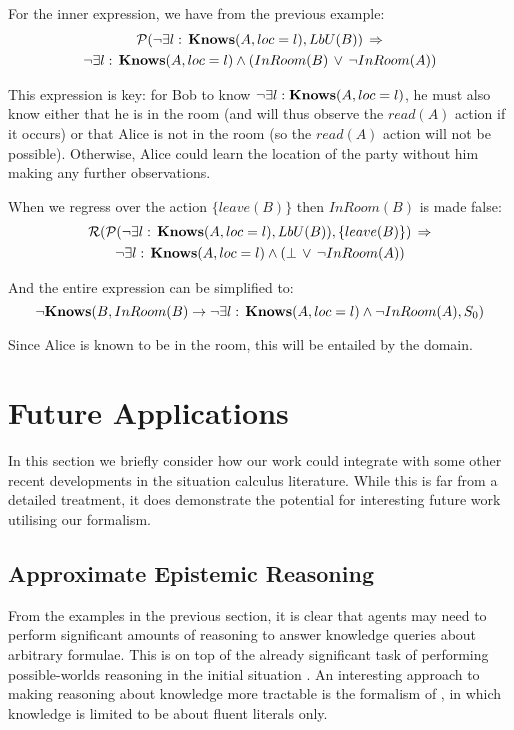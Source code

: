 For the inner expression, we have from the previous example:\begin{multline*}
\mathcal{P}(\neg\exists l:\,\mathbf{Knows}(A,loc=l),LbU(B))\,\Rightarrow\\
\neg\exists l:\,\mathbf{Knows}(A,loc=l)\wedge\left(InRoom(B)\,\vee\,\neg InRoom(A)\right)\end{multline*}


This expression is key: for Bob to know $\neg\exists l:\mathbf{Knows}(A,loc=l)$,
he must also know either that he is in the room (and will thus observe
the $read(A)$ action if it occurs) or that Alice is not in the room
(so the $read(A)$ action will not be possible). Otherwise, Alice
could learn the location of the party without him making any further
observations.

When we regress over the action $\{leave(B)\}$ then $InRoom(B)$
is made false:\begin{multline*}
\mathcal{R}(\mathcal{P}(\neg\exists l:\,\mathbf{Knows}(A,loc=l),LbU(B)),\{leave(B)\})\,\Rightarrow\\
\neg\exists l:\,\mathbf{Knows}(A,loc=l)\wedge\left(\bot\,\vee\,\neg InRoom(A)\right)\end{multline*}


And the entire expression can be simplified to:\[
\neg\mathbf{Knows}(B,InRoom(B)\rightarrow\neg\exists l:\,\mathbf{Knows}(A,loc=l)\wedge\neg InRoom(A),S_{0})\]


Since Alice is known to be in the room, this will be entailed by the
domain.

\newpage{}


\section{Future Applications\label{sec:Knowledge:Advances}}

In this section we briefly consider how our work could integrate with
some other recent developments in the situation calculus literature.
While this is far from a detailed treatment, it does demonstrate the
potential for interesting future work utilising our formalism.


\subsection{Approximate Epistemic Reasoning}

From the examples in the previous section, it is clear that agents
may need to perform significant amounts of reasoning to answer knowledge
queries about arbitrary formulae. This is on top of the already significant
task of performing possible-worlds reasoning in the initial situation
\citep{Petrick06thesis}. An interesting approach to making reasoning
about knowledge more tractable is the formalism of \citet{demolombe00tractable_sc_belief},
in which knowledge is limited to be about fluent literals only.

